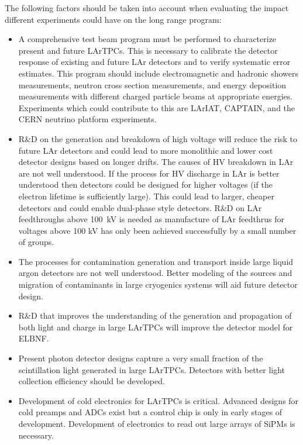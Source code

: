 The following factors should be taken into account when evaluating the impact different experiments 
could have on the long range program:

\begin{itemize}

\item A comprehensive test beam program must be performed to characterize present and future 
LArTPCs. This is necessary to calibrate the detector response of existing and future LAr detectors and to 
verify systematic error estimates. This program should include electromagnetic and hadronic 
showers measurements, neutron cross section measurements, and energy deposition measurements 
with different charged particle beams at appropriate energies. Experiments 
which could contribute to this are LArIAT, CAPTAIN, and the CERN neutrino platform experiments.

\item R\&D on the generation and breakdown of high voltage will reduce the risk to future LAr detectors 
and could lead to more monolithic and lower cost detector designs based on longer drifts. The causes of 
HV breakdown in LAr are not well understood. If the process for HV discharge in LAr is better understood 
then detectors could be designed for higher voltages (if the electron lifetime is sufficiently large). This 
could lead to larger, cheaper detectors and could enable dual-phase style detectors. R\&D on LAr 
feedthroughs above 100~kV is needed as manufacture of LAr feedthrus for voltages above 100 kV has only been achieved successfully by a 
small number of groups.

\item The processes for contamination generation and transport inside large liquid argon detectors are 
not well understood. Better modeling of the sources and migration of contaminants in large cryogenics 
systems will aid future detector design.

\item R\&D that improves the understanding of the generation and propagation of both light and 
charge in large LArTPCs will improve the detector model for ELBNF.
 
\item Present photon detector designs capture a very small fraction of the scintillation light generated in 
large LArTPCs. Detectors with better light collection efficiency should be developed.

\item Development of cold electronics for LArTPCs is critical. Advanced designs for cold 
preamps and ADCs exist but a control chip is only in early stages of development. Development of 
electronics to read out large arrays of SiPMs is necessary.

\end{itemize}




